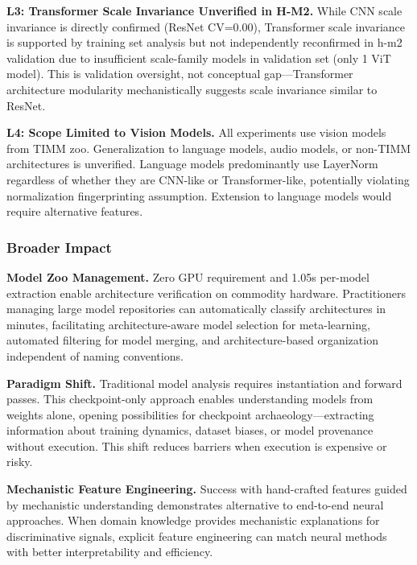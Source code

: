 \textbf{L3: Transformer Scale Invariance Unverified in H-M2.} While CNN scale invariance is directly confirmed (ResNet CV=0.00), Transformer scale invariance is supported by training set analysis but not independently reconfirmed in h-m2 validation due to insufficient scale-family models in validation set (only 1 ViT model). This is validation oversight, not conceptual gap---Transformer architecture modularity mechanistically suggests scale invariance similar to ResNet.

\textbf{L4: Scope Limited to Vision Models.} All experiments use vision models from TIMM zoo. Generalization to language models, audio models, or non-TIMM architectures is unverified. Language models predominantly use LayerNorm regardless of whether they are CNN-like or Transformer-like, potentially violating normalization fingerprinting assumption. Extension to language models would require alternative features.

\subsubsection{Broader Impact}

\textbf{Model Zoo Management.} Zero GPU requirement and 1.05s per-model extraction enable architecture verification on commodity hardware. Practitioners managing large model repositories can automatically classify architectures in minutes, facilitating architecture-aware model selection for meta-learning, automated filtering for model merging, and architecture-based organization independent of naming conventions.

\textbf{Paradigm Shift.} Traditional model analysis requires instantiation and forward passes. This checkpoint-only approach enables understanding models from weights alone, opening possibilities for checkpoint archaeology---extracting information about training dynamics, dataset biases, or model provenance without execution. This shift reduces barriers when execution is expensive or risky.

\textbf{Mechanistic Feature Engineering.} Success with hand-crafted features guided by mechanistic understanding demonstrates alternative to end-to-end neural approaches. When domain knowledge provides mechanistic explanations for discriminative signals, explicit feature engineering can match neural methods with better interpretability and efficiency.
